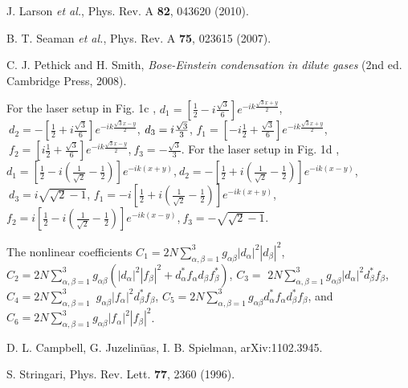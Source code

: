 \documentclass[prl,twocolumn,showpacs,floatfix]{revtex4}
\begin{document}
\begin{thebibliography}{99}
 J. Larson \textit{et al.}, Phys. Rev. A \textbf{82}, 043620
(2010).

 B. T. Seaman \textit{et al.}, Phys. Rev. A \textbf{75},
023615 (2007).

 C. J. Pethick and H. Smith, \textit{Bose-Einstein
condensation in dilute gases} (2nd ed. Cambridge Press, 2008).

 For the laser setup in Fig. 1c \cite{Zhang}, $d_{1}=[\frac{1%
}{2}-i\frac{\sqrt{3}}{6}]e^{-ik\frac{\sqrt{3}x+y}{2}}$,$\ d_{2}=-[\frac{1}{2}%
+i\frac{\sqrt{3}}{6}]e^{-ik\frac{\sqrt{3}x-y}{2}}$,$\ d_{3}=i\frac{\sqrt{3}}{%
3}$, $f_{1}=[-i\frac{1}{2}+\frac{\sqrt{3}}{6}]e^{-ik\frac{\sqrt{3}x+y}{2}}$,$%
\ f_{2}=[i\frac{1}{2}+\frac{\sqrt{3}}{6}]e^{-ik\frac{\sqrt{3}x-y}{2}}$,$\
f_{3}=-\frac{\sqrt{3}}{3}$. For the laser setup in Fig. 1d \cite{Juzeliunas}%
, $d_{1}=[\frac{1}{2}-i(\frac{1}{\sqrt{2}}-\frac{1}{2})]e^{-ik(x+y)}$,$\
d_{2}=-[\frac{1}{2}+i(\frac{1}{\sqrt{2}}-\frac{1}{2})]e^{-ik(x-y)}$,$\
d_{3}=i\sqrt{\sqrt{2}-1}$, $f_{1}=-i[\frac{1}{2}+i(\frac{1}{\sqrt{2}}-\frac{1%
}{2})]e^{-ik(x+y)}$, $f_{2}=i[\frac{1}{2}-i(\frac{1}{\sqrt{2}}-\frac{1}{2}%
)]e^{-ik(x-y)}$,$\ f_{3}=-\sqrt{\sqrt{2}-1}$.

\bibitem{coe} The nonlinear coefficients $C_{1}=2N\sum_{\alpha ,\beta
=1}^{3}g_{\alpha \beta }|d_{\alpha }|^{2}|d_{\beta }|^{2}$, $%
C_{2}=2N\sum_{\alpha ,\beta =1}^{3}g_{\alpha \beta }\left( |d_{\alpha
}|^{2}|f_{\beta }|^{2}+d_{\alpha }^{\ast }f_{\alpha }d_{\beta }f_{\beta
}^{\ast }\right) $, $C_{3}=$ $2N\sum_{\alpha ,\beta =1}^{3}g_{\alpha \beta
}|d_{\alpha }|^{2}d_{\beta }^{\ast }f_{\beta }$, $C_{4}=2N\sum_{\alpha
,\beta =1}^{3}$ $g_{\alpha \beta }|f_{\alpha }|^{2}d_{\beta }^{\ast
}f_{\beta }$, $C_{5}=2N\sum_{\alpha ,\beta =1}^{3}g_{\alpha \beta }d_{\alpha
}^{\ast }f_{\alpha }d_{\beta }^{\ast }f_{\beta }$, and $C_{6}=2N\sum_{\alpha
,\beta =1}^{3}g_{\alpha \beta }|f_{\alpha }|^{2}|f_{\beta }|^{2}$.

\bibitem{Ian3} D. L. Campbell, G. Juzelin\={u}as, I. B. Spielman,
arXiv:1102.3945.

\bibitem{Stringari} S. Stringari, Phys. Rev. Lett. \textbf{77}, 2360 (1996).
\end{thebibliography}
\end{document}
